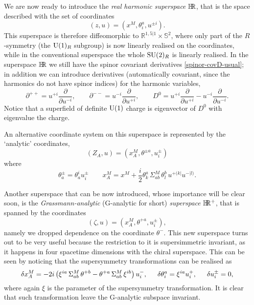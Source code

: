 We are now ready to introduce the \emph{real harmonic superspace}  $\mathbb{H}\hspace{-0.385em}\mathbb{R}$, that is the space described with the set of coordinates
\begin{equation}
(z,u) = \left( x^M, \theta^a_i, u^{\pm i} \right).
\end{equation}
This superspace is therefore diffeomorphic to $\mathbb{R}^{1,5|1} \times \mathbb{S}^2$, where only part of the $R$-symmetry (the ${ \text{U} }(1)_R$ subgroup) is now linearly realised on the coordinates, while in the conventional superspace the whole ${ \text{SU} }(2)_R$ is linearly realised. In the superspace  $\mathbb{H}\hspace{-0.385em}\mathbb{R}$ we still have the spinor covariant derivatives \eqref{spinor-covD-usual}; in addition we can introduce derivatives (automatically covariant, since the harmonics do not have spinor indices) for the harmonic variables,
\begin{equation}
\partial^{++} = u^{+i} \frac{\partial}{\partial u^{-i}},
\hspace{2em}
\partial^{--} = u^{-i} \frac{\partial }{\partial u^{+i}},
\hspace{2em}
D^0 = u^{+i} \frac{\partial}{\partial u^{+i}} - u^{-i} \frac{\partial}{\partial u^{-i}}.
\end{equation}
Notice that a superfield of definite ${ \text{U} }(1)$ charge is eigenvector of $D^0$ with eigenvalue the charge.

An alternative coordinate system on this superspace is represented by the `analytic' coordinates,
\begin{equation}
( Z_A , u) = (x^M_A, \theta^{\pm a}, u^\pm_i) 
\end{equation}
where
\begin{equation}
\theta^{\pm }_a = \theta^i_a u_i^\pm
\qquad
x^M_A = x^M + \frac{i}{2} \theta^a_k\, \Sigma^M_{ab} \, \theta^b_l \, u^{+(k|} u^{-|l)}.
\end{equation}






Another superspace that can be now introduced, whose importance will be clear soon, is the \emph{Grassmann-analytic} (G-analytic for short) \emph{superspace} $\mathbb{H}\hspace{-0.385em}\mathbb{R}^+$, that is spanned by the coordinates
\begin{equation}
(\zeta , u ) = \left( x^M_A, \theta^{+ a},  u^\pm_i \right) ,
\end{equation}
namely we dropped dependence on the coordinate $\theta^-$.
This new superspace turns out to be very useful because the restriction to it is supersimmetric invariant, as it happens in four spacetime dimensions with the chiral superspace. This can be seen by noticing that the supersymmetry transformations can be realised as 
\begin{equation}
\delta x^M_A
= -2 i \left(
\xi^{ia} \, \Sigma^M_{ab} \, \theta^{+b}
- \theta^{+a} \, \Sigma^M_{ab} \, \xi^{ib}
\right)u^-_i,
\hspace{1.5em}
\delta\theta^a_i =  \xi^{ia} u^+_i,
\hspace{1.5em}
\delta u^\pm_i=  0
,
\end{equation}
where again $\xi$ is the parameter of the supersymmetry transformation. It is clear that such transformation leave the G-analytic subspace invariant.


